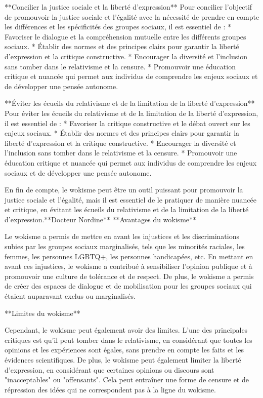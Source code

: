**Concilier la justice sociale et la liberté d'expression**
Pour concilier l'objectif de promouvoir la justice sociale et l'égalité avec la nécessité de prendre en compte les différences et les spécificités des groupes sociaux, il est essentiel de :
* Favoriser le dialogue et la compréhension mutuelle entre les différents groupes sociaux.
* Établir des normes et des principes clairs pour garantir la liberté d'expression et la critique constructive.
* Encourager la diversité et l'inclusion sans tomber dans le relativisme et la censure.
* Promouvoir une éducation critique et nuancée qui permet aux individus de comprendre les enjeux sociaux et de développer une pensée autonome.

**Éviter les écueils du relativisme et de la limitation de la liberté d'expression**
Pour éviter les écueils du relativisme et de la limitation de la liberté d'expression, il est essentiel de :
* Favoriser la critique constructive et le débat ouvert sur les enjeux sociaux.
* Établir des normes et des principes clairs pour garantir la liberté d'expression et la critique constructive.
* Encourager la diversité et l'inclusion sans tomber dans le relativisme et la censure.
* Promouvoir une éducation critique et nuancée qui permet aux individus de comprendre les enjeux sociaux et de développer une pensée autonome.

En fin de compte, le wokisme peut être un outil puissant pour promouvoir la justice sociale et l'égalité, mais il est essentiel de le pratiquer de manière nuancée et critique, en évitant les écueils du relativisme et de la limitation de la liberté d'expression.**Docteur Nordine**
**Avantages du wokisme**

Le wokisme a permis de mettre en avant les injustices et les discriminations subies par les groupes sociaux marginalisés, tels que les minorités raciales, les femmes, les personnes LGBTQ+, les personnes handicapées, etc. En mettant en avant ces injustices, le wokisme a contribué à sensibiliser l'opinion publique et à promouvoir une culture de tolérance et de respect. De plus, le wokisme a permis de créer des espaces de dialogue et de mobilisation pour les groupes sociaux qui étaient auparavant exclus ou marginalisés.

**Limites du wokisme**

Cependant, le wokisme peut également avoir des limites. L'une des principales critiques est qu'il peut tomber dans le relativisme, en considérant que toutes les opinions et les expériences sont égales, sans prendre en compte les faits et les évidences scientifiques. De plus, le wokisme peut également limiter la liberté d'expression, en considérant que certaines opinions ou discours sont "inacceptables" ou "offensants". Cela peut entraîner une forme de censure et de répression des idées qui ne correspondent pas à la ligne du wokisme.

